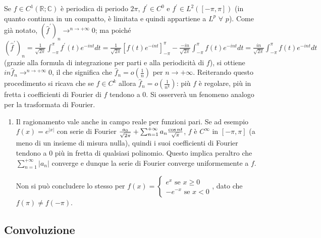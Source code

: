 \documentclass{article}
\begin{document}
Se $f\in C^{1}\left( 
\mathbb{R}
;%
\mathbb{C}
\right) $ \`{e} periodica di periodo $2\pi $, $f^{\prime }\in C^{0}$ e $%
f^{\prime }\in L^{2}\left( \left[ -\pi ,\pi \right] \right) $ (in quanto
continua in un compatto, \`{e} limitata e quindi appartiene a $L^{p}$ $%
\forall $ $p$). Come gi\`{a} notato, $\left( \hat{f}^{\prime }\right)
_{n}\rightarrow ^{n\rightarrow +\infty }0$; ma poich\'{e} $\left( \hat{f}%
^{\prime }\right) _{n}=\frac{1}{\sqrt{2\pi }}\int_{-\pi }^{\pi }f^{\prime
}\left( t\right) e^{-int}dt=\frac{1}{\sqrt{2\pi }}\left[ f\left( t\right)
e^{-int}\right] _{-\pi }^{\pi }-\frac{-in}{\sqrt{2\pi }}\int_{-\pi }^{\pi
}f\left( t\right) e^{-int}dt=\frac{in}{\sqrt{2\pi }}\int_{-\pi }^{\pi
}f\left( t\right) e^{-int}dt$ (grazie alla formula di integrazione per parti
e alla periodicit\`{a} di $f$), si ottiene $in\hat{f}_{n}\rightarrow
^{n\rightarrow +\infty }0$, il che significa che $\hat{f}_{n}=o\left( \frac{1%
}{n}\right) $ per $n\rightarrow +\infty $. Reiterando questo procedimento si
ricava che se $f\in C^{k}$ allora $\hat{f}_{n}=o\left( \frac{1}{n^{k}}%
\right) $: pi\`{u} $f$ \`{e} regolare, pi\`{u} in fretta i coefficienti di
Fourier di $f$ tendono a $0$. Si osserver\`{a} un fenomeno analogo per la
trasformata di Fourier.

\begin{enumerate}
\item Il ragionamento vale anche in campo reale per funzioni pari. Se ad
esempio $f\left( x\right) =e^{\left\vert x\right\vert }$ con serie di
Fourier $\frac{a_{0}}{\sqrt{2\pi }}+\sum_{n=1}^{+\infty }a_{n}\frac{\cos nt}{%
\sqrt{\pi }}$, $f$ \`{e} $C^{\infty }$ in $\left[ -\pi ,\pi \right] $ (a
meno di un insieme di misura nulla), quindi i suoi coefficienti di Fourier
tendono a $0$ pi\`{u} in fretta di qualsiasi polinomio. Questo implica
peraltro che $\sum_{n=1}^{+\infty }\left\vert a_{n}\right\vert $ converge e
dunque la serie di Fourier converge uniformemente a $f$.

Non si pu\`{o} concludere lo stesso per $f\left( x\right) =\left\{ 
\begin{array}{c}
e^{x}\text{ se }x\geq 0 \\ 
-e^{-x}\text{ se }x<0%
\end{array}%
\right. $, dato che $f\left( \pi \right) \neq f\left( -\pi \right) $.
\end{enumerate}

\subsection{Convoluzione}
\end{document}
